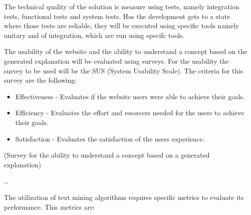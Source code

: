 The technical quality of the solution is measure using tests, namely integration tests, functional tests and system tests.
Has the development gets to a state where those tests are reliable, they will be executed using specific tools  namely unitary and of integration, which are run using specifc tools.

The usability of the website and the ability to understand a concept based on the generated explanation will be evaluated using surveys.
For the usability the survey to be used will be the SUS (System Usability Scale).
The criteria for this survey are the following:

\begin{itemize}
    \item Effectiveness - Evaluates if the website users were able to achieve their goals.
    \item Efficiency - Evaluates the effort and resorcers needed for the users to achieve their goals.
    \item Satisfaction - Evaluates the satisfaction of the users experience.
\end{itemize}

(Survey for the ability to understand a concept based on a generated explanation)

\dots


The utilization of text mining algorithms requires specific metrics to evaluate its performance.
This metrics are: 

